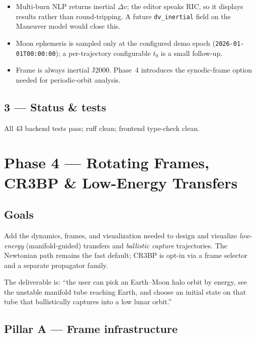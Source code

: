 \documentclass[11pt, a4paper]{article}
\begin{document}
\begin{itemize}[leftmargin=*]
  \item Multi-burn NLP returns inertial $\Delta v$; the editor speaks RIC,
        so it displays results rather than round-tripping. A future
        \texttt{dv\_inertial} field on the Maneuver model would close this.
  \item Moon ephemeris is sampled only at the configured demo epoch
        (\texttt{2026-01-01T00:00:00}); a per-trajectory configurable
        $t_0$ is a small follow-up.
  \item Frame is always inertial J2000. Phase~4 introduces the
        synodic-frame option needed for periodic-orbit analysis.
\end{itemize}

\subsection{3 — Status \& tests}

All 43 backend tests pass; ruff clean; frontend type-check clean.

\newpage
\section{Phase 4 — Rotating Frames, CR3BP \& Low-Energy Transfers}

\subsection{Goals}

Add the dynamics, frames, and visualization needed to design and visualize
\emph{low-energy} (manifold-guided) transfers and \emph{ballistic capture}
trajectories. The Newtonian path remains the fast default; CR3BP is opt-in
via a frame selector and a separate propagator family.

The deliverable is: ``the user can pick an Earth--Moon halo orbit by energy,
see the unstable manifold tube reaching Earth, and choose an initial state
on that tube that ballistically captures into a low lunar orbit.''

\subsection{Pillar A --- Frame infrastructure}
\end{document}
